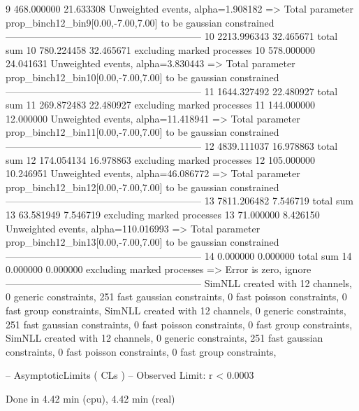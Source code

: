 9          468.000000      21.633308       Unweighted events, alpha=1.908182
  => Total parameter prop_binch12_bin9[0.00,-7.00,7.00] to be gaussian constrained
------------------------------------------------------------
10         2213.996343     32.465671       total sum                     
10         780.224458      32.465671       excluding marked processes    
10         578.000000      24.041631       Unweighted events, alpha=3.830443
  => Total parameter prop_binch12_bin10[0.00,-7.00,7.00] to be gaussian constrained
------------------------------------------------------------
11         1644.327492     22.480927       total sum                     
11         269.872483      22.480927       excluding marked processes    
11         144.000000      12.000000       Unweighted events, alpha=11.418941
  => Total parameter prop_binch12_bin11[0.00,-7.00,7.00] to be gaussian constrained
------------------------------------------------------------
12         4839.111037     16.978863       total sum                     
12         174.054134      16.978863       excluding marked processes    
12         105.000000      10.246951       Unweighted events, alpha=46.086772
  => Total parameter prop_binch12_bin12[0.00,-7.00,7.00] to be gaussian constrained
------------------------------------------------------------
13         7811.206482     7.546719        total sum                     
13         63.581949       7.546719        excluding marked processes    
13         71.000000       8.426150        Unweighted events, alpha=110.016993
  => Total parameter prop_binch12_bin13[0.00,-7.00,7.00] to be gaussian constrained
------------------------------------------------------------
14         0.000000        0.000000        total sum                     
14         0.000000        0.000000        excluding marked processes    
  => Error is zero, ignore      
------------------------------------------------------------
SimNLL created with 12 channels, 0 generic constraints, 251 fast gaussian constraints, 0 fast poisson constraints, 0 fast group constraints, 
SimNLL created with 12 channels, 0 generic constraints, 251 fast gaussian constraints, 0 fast poisson constraints, 0 fast group constraints, 
SimNLL created with 12 channels, 0 generic constraints, 251 fast gaussian constraints, 0 fast poisson constraints, 0 fast group constraints, 

 -- AsymptoticLimits ( CLs ) --
Observed Limit: r < 0.0003

Done in 4.42 min (cpu), 4.42 min (real)
